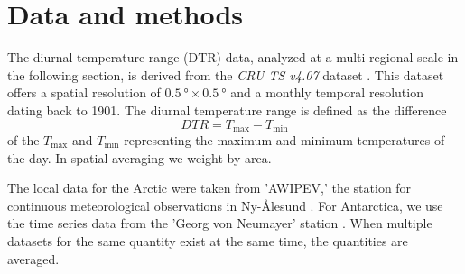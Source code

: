  
\chapter{Data and methods}
\label{cha:theory}

The diurnal temperature range (DTR) data, analyzed at a multi-regional scale in the following section, is derived from the \textit{CRU TS v4.07} dataset \cite{Harris.2020}. This dataset offers a spatial resolution of $\SI{0.5}{\degree} \times \SI{0.5}{\degree}$ and a monthly temporal resolution dating back to 1901.
The diurnal temperature range is defined as the difference
\begin{equation}
    DTR = T_{\mathrm{max}} - T_{\mathrm{min}}
\end{equation}
of the $T_{\mathrm{max}}$ and $T_{\mathrm{min}}$ representing the maximum and minimum temperatures of the day. In spatial averaging we weight by area.

The local data for the Arctic were taken from 'AWIPEV,' the station for continuous meteorological observations in Ny-Ålesund \cite{Maturilli.2020}. For Antarctica, we use the time series data from the 'Georg von Neumayer' station \cite{KonigLanglo.2017}. When multiple datasets for the same quantity exist at the same time, the 
quantities are averaged. 

